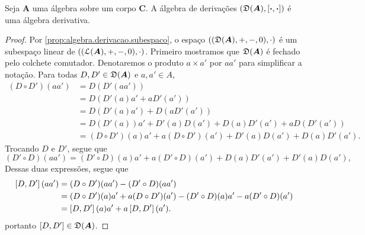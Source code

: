 \begin{proposition}
\label{alge:prop.algebra.colchete.deriv}
Seja $\bm A$ uma álgebra sobre um corpo $\bm C$. A álgebra de derivações $(\mathfrak{D}(\bm A),\left[{\bm{\cdot}},{\bm{\cdot}}\right])$ é uma álgebra derivativa.%
\end{proposition}
\begin{proof}
Por \ref{prop:algebra.derivacao.subespaco}, o espaço $((\mathfrak{D}(\bm A),+,-,0),\cdot)$ é um subespaço linear de $((\mathcal{L}(\bm A),+,-,0),\cdot)$. Primeiro mostramos que $\mathfrak{D}(\bm A)$ é fechado pelo colchete comutador. Denotaremos o produto $a \times a'$ por $aa'$ para simplificar a notação. Para todas $D,D' \in \mathfrak{D}(\bm A)$ e $a,a' \in A$,
	\begin{align*}
		(D \circ D')(aa') &= D(D'(aa')) \\
			&= D(D'(a)a' + aD'(a')) \\
			&= D(D'(a)a') + D(aD'(a')) \\
			&= D(D'(a))a' + D'(a)D(a') + D(a)D'(a') + a D(D'(a')) \\
			&= (D \circ D')(a)a' + a (D \circ D')(a') + D'(a)D(a') + D(a)D'(a').
		\end{align*}
Trocando $D$ e $D'$, segue que
		\begin{equation*}
		(D' \circ D)(aa') = (D' \circ D)(a)a' + a (D' \circ D)(a') + D(a)D'(a') + D'(a)D(a'),
		\end{equation*}
Dessas duas expressões, segue que
		\begin{align*}
		\left[{D},{D'}\right](aa') &= (D \circ D')(aa') - (D' \circ D)(aa') \\
			&= (D \circ D')(a)a' + a (D \circ D')(a') - (D' \circ D)(a)a' - a (D' \circ D)(a') \\
			&= \left[{D},{D'}\right](a)a' + a\left[{D},{D'}\right](a').
		\end{align*}
portanto $\left[{D},{D'}\right] \in \mathfrak{D}(\bm A)$.

\end{proof}

